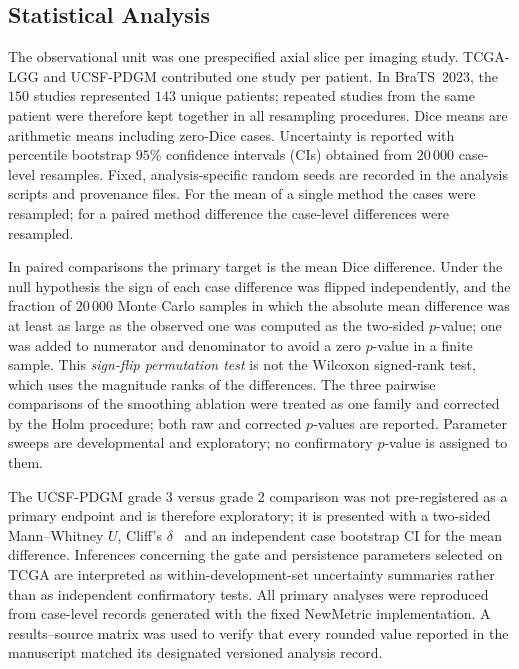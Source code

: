 \documentclass[11pt,a4paper]{article}
\begin{document}
\subsection{Statistical Analysis}\label{sec:statistics}

The observational unit was one prespecified axial slice per imaging study.
TCGA-LGG and UCSF-PDGM contributed one study per patient. In BraTS~2023, the
$150$ studies represented $143$ unique patients; repeated studies from the same
patient were therefore kept together in all resampling procedures.
Dice means are arithmetic means including zero-Dice cases. Uncertainty is reported
with percentile bootstrap $95\%$ confidence intervals (CIs) obtained from
$20\,000$ case-level resamples. Fixed, analysis-specific random seeds are recorded
in the analysis scripts and provenance files. For the
mean of a single method the cases were resampled; for a paired method difference
the case-level differences were resampled.

In paired comparisons the primary target is the mean Dice difference. Under the
null hypothesis the sign of each case difference was flipped independently, and
the fraction of $20\,000$ Monte Carlo samples in which the absolute mean difference
was at least as large as the observed one was computed as the two-sided $p$-value;
one was added to numerator and denominator to avoid a zero $p$-value in a finite
sample. This \emph{sign-flip permutation test} is not the Wilcoxon signed-rank
test, which uses the magnitude ranks of the differences. The three pairwise
comparisons of the smoothing ablation were treated as one family and corrected by
the Holm procedure; both raw and corrected $p$-values are reported. Parameter
sweeps are developmental and exploratory; no confirmatory $p$-value is assigned to
them.

The UCSF-PDGM grade 3 versus grade 2 comparison was not pre-registered as a
primary endpoint and is therefore exploratory; it is presented with a two-sided
Mann--Whitney $U$, Cliff's $\delta$~\cite{cliff1993} and an independent case
bootstrap CI for the mean difference. Inferences concerning the gate and
persistence parameters selected on TCGA are interpreted as within-development-set
uncertainty summaries rather than as independent confirmatory tests. All primary
analyses were reproduced from case-level records generated with the fixed
NewMetric implementation. A results--source matrix was used to verify that every
rounded value reported in the manuscript matched its designated versioned
analysis record.
\end{document}
